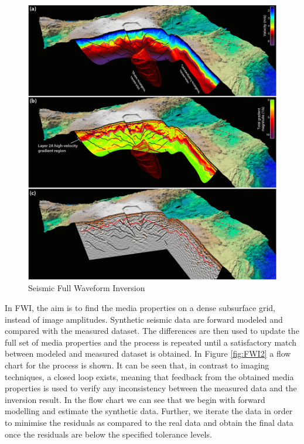\documentclass[10pt,a4paper]{article}
\begin{document}
\begin{figure}[h!]
  \includegraphics[width=0.75\linewidth]{FWI1.png}
  \caption{Seismic Full Waveform Inversion}
  \label{fig:FWI1}
\end{figure}

In FWI, the aim is to find the media properties on a dense subsurface
grid, instead of image amplitudes. Synthetic seismic data are forward
modeled and compared with the measured dataset. The differences are
then used to update the full set of media properties and the process
is repeated until a satisfactory match between modeled and measured
dataset is obtained. In Figure \ref{fig:FWI2} a flow chart
for the process is shown. It can be seen that, in contrast to imaging
techniques, a closed loop exists, meaning that feedback from the
obtained media properties is used to verify any inconsistency between
the measured data and the inversion result. In the flow chart we can
see that we begin with forward modelling and estimate the synthetic
data. Further, we iterate the data in order to minimise the residuals
as compared to the real data and obtain the final data once the
residuals are below the specified tolerance levels.
\end{document}
